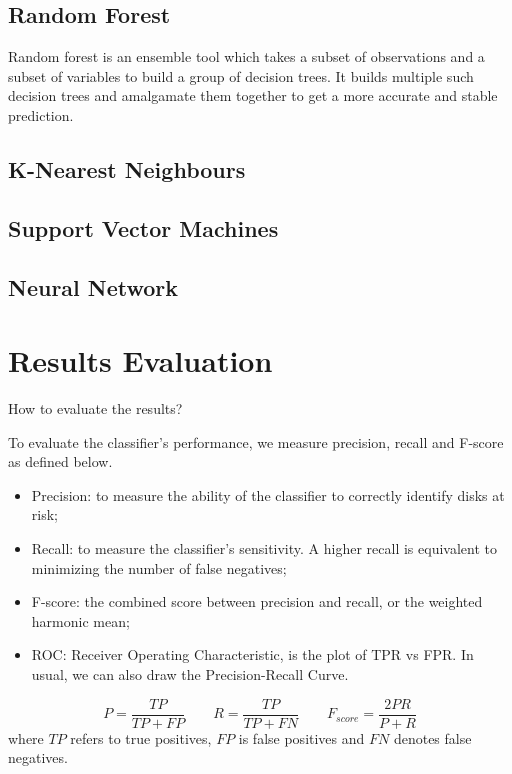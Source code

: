 \documentclass[12pt,a4paper,english]{amsart}
\begin{document}
\subsection*{Random Forest}

Random forest is an ensemble tool which takes a subset of observations and a subset of variables to build a group of decision trees. It builds multiple such decision trees and amalgamate them together to get a more accurate and stable prediction.

\subsection*{K-Nearest Neighbours}

\subsection*{Support Vector Machines}

\subsection*{Neural Network}

%
\section{Results Evaluation}

How to evaluate the results?

To evaluate the classifier's performance, we measure precision, recall and F-score as defined below.
\begin{itemize}
	\item Precision: to measure the ability of the classifier to correctly identify disks at risk;
	\item Recall: to measure the classifier's sensitivity. A higher recall is equivalent to minimizing the number of false negatives;
	\item F-score: the combined score between precision and recall, or the weighted harmonic mean;
	\item ROC: Receiver Operating Characteristic, is the plot of TPR vs FPR. In usual, we can also draw the Precision-Recall Curve.
\end{itemize}

\begin{equation}
	P = \dfrac{TP}{TP+FP} \quad\quad 
	R = \dfrac{TP}{TP+FN} \quad\quad 
	F_{score} = \dfrac{2PR}{P+R}
\end{equation}
where $TP$ refers to true positives, $FP$ is false positives and $FN$ denotes false negatives.
\end{document}

